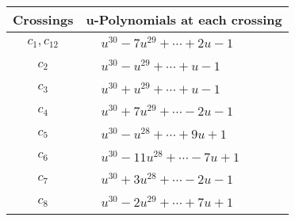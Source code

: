 \documentclass[1p]{elsarticle_modified}
\theoremstyle{definition}
\begin{document}
\begin{tabular}{m{50pt}|m{274pt}}
Crossings & \hspace{64pt}u-Polynomials at each crossing \\
\hline $$\begin{aligned}c_{1},c_{12}\end{aligned}$$&$\begin{aligned}
&u^{30}-7 u^{29}+\cdots+2 u-1
\end{aligned}$\\
\hline $$\begin{aligned}c_{2}\end{aligned}$$&$\begin{aligned}
&u^{30}- u^{29}+\cdots+u-1
\end{aligned}$\\
\hline $$\begin{aligned}c_{3}\end{aligned}$$&$\begin{aligned}
&u^{30}+u^{29}+\cdots+u-1
\end{aligned}$\\
\hline $$\begin{aligned}c_{4}\end{aligned}$$&$\begin{aligned}
&u^{30}+7 u^{29}+\cdots-2 u-1
\end{aligned}$\\
\hline $$\begin{aligned}c_{5}\end{aligned}$$&$\begin{aligned}
&u^{30}- u^{28}+\cdots+9 u+1
\end{aligned}$\\
\hline $$\begin{aligned}c_{6}\end{aligned}$$&$\begin{aligned}
&u^{30}-11 u^{28}+\cdots-7 u+1
\end{aligned}$\\
\hline $$\begin{aligned}c_{7}\end{aligned}$$&$\begin{aligned}
&u^{30}+3 u^{28}+\cdots-2 u-1
\end{aligned}$\\
\hline $$\begin{aligned}c_{8}\end{aligned}$$&$\begin{aligned}
&u^{30}-2 u^{29}+\cdots+7 u+1
\end{aligned}$\\

\end{tabular}
\end{document}
